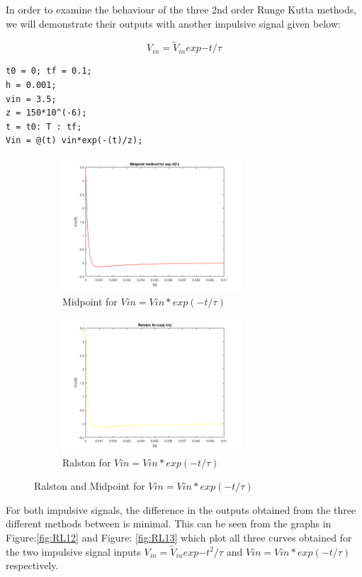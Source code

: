 \documentclass[11pt,a4paper]{article}
\begin{document}
In order to examine the behaviour of the three 2nd order Runge Kutta methods, we will demonstrate their outputs with another impulsive signal given below:

\begin{equation}
V_{in} = \tilde{V}_{in}  exp{-t/\tau}
\end{equation}

\begin{verbatim}
t0 = 0; tf = 0.1;
h = 0.001;
vin = 3.5;
z = 150*10^(-6);
t = t0: T : tf;
Vin = @(t) vin*exp(-(t)/z);
\end{verbatim}

\begin{figure}[h]
\begin{subfigure}{.5\textwidth}
  \includegraphics[width=.9\linewidth,height = 5cm]{Ex1_Figs/mid_t.png}
  \caption[right]{Midpoint for $Vin = Vin*exp(-t/\tau)$}
  \label{fig:RL10}
\end{subfigure}
\begin{subfigure}{.5\textwidth}
  \includegraphics[width=.9\linewidth,height = 5cm]{Ex1_Figs/rals_t.png}
  \caption{Ralston for $Vin = Vin*exp(-t/\tau)$}
  \label{fig:RL11}
\end{subfigure}
\caption{Ralston and Midpoint for $Vin = Vin*exp(-t/\tau)$}
\label{fig:RLy}
\end{figure}


For both impulsive signals, the difference in the outputs obtained from the three different methods between  is minimal. This can be seen from the graphs in Figure:\ref{fig:RL12} and Figure: \ref{fig:RL13} which plot all three curves obtained for the two impulsive signal inputs $V_{in} = \tilde{V}_{in}  exp{-t^2/\tau}$ and $Vin = Vin*exp(-t/\tau)$ respectively.
\end{document}
